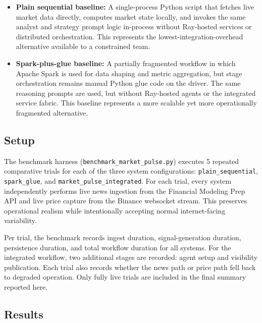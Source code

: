\documentclass[12pt, a4paper]{report}
\begin{document}
\begin{itemize}
  \item \textbf{Plain sequential baseline:} A single-process Python script that
  fetches live market data directly, computes market state locally, and invokes the
  same analyst and strategy prompt logic in-process without Ray-hosted services or
  distributed orchestration. This represents the lowest-integration-overhead
  alternative available to a constrained team.
  \item \textbf{Spark-plus-glue baseline:} A partially fragmented workflow in which
  Apache Spark is used for data shaping and metric aggregation, but stage orchestration
  remains manual Python glue code on the driver. The same reasoning prompts are used,
  but without Ray-hosted agents or the integrated service fabric. This baseline
  represents a more scalable yet more operationally fragmented alternative.
\end{itemize}

\subsection{Setup}
\label{ssec:exp2_setup}

The benchmark harness (\texttt{benchmark\_market\_pulse.py}) executes 5 repeated
comparative trials for each of the three system configurations:
\texttt{plain\_sequential}, \texttt{spark\_glue}, and
\texttt{market\_pulse\_integrated}.
For each trial, every system independently performs live news ingestion from the
Financial Modeling Prep API and live price capture from the Binance websocket stream.
This preserves operational realism while intentionally accepting normal
internet-facing variability.

Per trial, the benchmark records ingest duration, signal-generation duration,
persistence duration, and total workflow duration for all systems. For the integrated
workflow, two additional stages are recorded: agent setup and visibility publication.
Each trial also records whether the news path or price path fell back to degraded
operation. Only fully live trials are included in the final summary reported here.

\subsection{Results}
\label{ssec:exp2_results}
\end{document}
